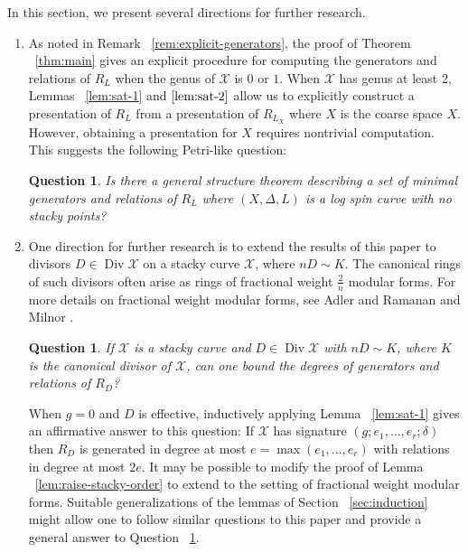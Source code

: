 \documentclass{amsart}
\theoremstyle{plain}
\newtheorem{question}[thm]{Question}
\theoremstyle{definition}
\theoremstyle{remark}
\numberwithin{equation}{section}
\DeclareMathOperator\di{Div}
\newcommand\sx{\mathscr X}
\newcommand{\halfcan}{L}
\begin{document}
In this section, we present several directions for further research.
\begin{enumerate}
	\item As noted in Remark ~\ref{rem:explicit-generators}, the 
		proof of Theorem ~\ref{thm:main} 
		gives an 
		explicit procedure for computing the generators and relations of $R_
		\halfcan$ when the genus of $\sx$ is $0$ or $1$.  When $\sx$ has genus at least 2, Lemmas ~\ref{lem:sat-1} and $\ref{lem:sat-2}$ allow us to explicitly construct a presentation of $R_\halfcan$ from a presentation of $R_{L_X}$ where $X$ is the coarse space $X$.  However, obtaining a presentation for $X$ requires nontrivial computation.  This suggests the following Petri-like question:
		\begin{question}
		\label{ques:spin-canonical-petri}
			Is there a general structure theorem describing a set of minimal 
			generators and relations of $R_{\halfcan}$ where $(X, \Delta, L)$ is a log spin curve with no stacky points?
		\end{question}
		
\item One direction for further research is to extend the results
	of this paper to divisors $D \in \di \sx$ on a stacky curve $\sx$, 
	where $nD \sim K.$ The canonical rings of such divisors often
	arise as rings of fractional weight $\frac{2}{n}$ modular forms.
	For more details on fractional weight modular forms, see Adler and
	Ramanan \cite[p. 96]{adler:moduli} and Milnor
	\cite[$\mathsection$ 6]{milnor:fractional-weight}.

\begin{question}
		\label{ques:fractional-weight}
			If $\sx$ is a stacky curve and $D \in \di \sx$ with $nD \sim K$, 
			where $K$ is the canonical divisor of $\sx$, can one bound the 
			degrees of generators and relations of $R_D$?
		\end{question}
		When $g=0$ and $D$ is effective, inductively applying Lemma ~\ref{lem:sat-1}  
		gives an affirmative answer to this question: If $\sx$ has signature 
		$(g; e_1, \ldots, e_r; \delta)$ then $R_D$ is generated in degree at 
		most $e = \max(e_1, \ldots, e_r)$ with relations in degree at most
		$2e$. 
		It may be possible to modify the proof of Lemma
		~\ref{lem:raise-stacky-order} to extend to the setting of fractional 
		weight modular forms. 
		Suitable generalizations of the 
		lemmas of Section ~\ref{sec:induction} might allow one to 
		follow similar questions to this paper and provide a general 
		answer to Question ~\ref{ques:fractional-weight}.
		\\


\end{enumerate}
\end{document}
